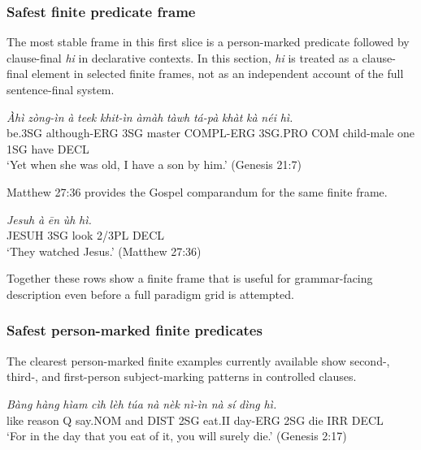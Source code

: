 \documentclass[
  11pt,
  a4paper,
]{article}
\newcommand{\tdim}[1]{\textit{#1}}
\newcommand{\tdimword}[1]{\textit{#1}}
\renewcommand{\textsc}[1]{{\footnotesize\MakeUppercase{#1}}}
\newcommand{\glossquote}[1]{`#1'}
\begin{document}
\subsubsection{Safest finite predicate
frame}\label{safest-finite-predicate-frame}

The most stable frame in this first slice is a person-marked predicate
followed by clause-final \tdim{hi} in declarative contexts. In this
section, \tdim{hi} is treated as a clause-final element in selected
finite frames, not as an independent account of the full sentence-final
system.

\begin{exe}
\ex \label{ex:vp-frame-gen21}
\gll \tdimword{Àhì} \tdimword{zòng-ìn} \tdimword{à} \tdimword{teek} \tdimword{khit-ìn} \tdimword{àmàh} \tdimword{tàwh} \tdimword{tá-pà} \tdimword{khàt} \tdimword{kà} \tdimword{néi} \tdimword{hì.} \\
     be.\textsc{3sg} although-\textsc{erg} \textsc{3sg} master \textsc{compl}-\textsc{erg} \textsc{3sg}.\textsc{pro} \textsc{com} child-male one \textsc{1sg} have \textsc{decl} \\
\glt \glossquote{Yet when she was old, I have a son by him.} (Genesis 21:7)
\end{exe}

Matthew 27:36 provides the Gospel comparandum for the same finite frame.

\begin{exe}
\ex \label{ex:vp-frame-matt27}
\gll \tdimword{Jesuh} \tdimword{à} \tdimword{ēn} \tdimword{ùh} \tdimword{hì.} \\
     \textsc{jesuh} \textsc{3sg} look 2/3PL \textsc{decl} \\
\glt \glossquote{They watched Jesus.} (Matthew 27:36)
\end{exe}

Together these rows show a finite frame that is useful for
grammar-facing description even before a full paradigm grid is
attempted.

\subsubsection{Safest person-marked finite
predicates}\label{safest-person-marked-finite-predicates}

The clearest person-marked finite examples currently available show
second-, third-, and first-person subject-marking patterns in controlled
clauses.

\begin{exe}
\ex \label{ex:vp-person-gen2}
\gll \tdimword{Bàng} \tdimword{hàng} \tdimword{hìam} \tdimword{cìh} \tdimword{lèh} \tdimword{túa} \tdimword{nà} \tdimword{nèk} \tdimword{nì-ìn} \tdimword{nà} \tdimword{sí} \tdimword{dìng} \tdimword{hì.} \\
     like reason \textsc{q} say.\textsc{nom} and \textsc{dist} \textsc{2sg} eat.\textsc{ii} day-\textsc{erg} \textsc{2sg} die \textsc{irr} \textsc{decl} \\
\glt \glossquote{For in the day that you eat of it, you will surely die.} (Genesis 2:17)
\end{exe}
\end{document}
